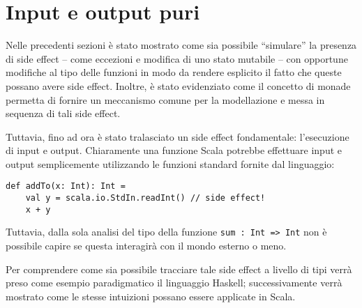 \section{Input e output puri}
\label{section:input-e-output-puri}

Nelle precedenti sezioni è stato mostrato come sia possibile ``simulare'' la presenza di side effect -- come eccezioni e modifica di uno stato mutabile -- con opportune modifiche al tipo delle funzioni in modo da rendere esplicito il fatto che queste possano avere side effect.
Inoltre, è stato evidenziato come il concetto di monade permetta di fornire un meccanismo comune per la modellazione e messa in sequenza di tali side effect.

Tuttavia, fino ad ora è stato tralasciato un side effect fondamentale: l'esecuzione di input e output.
Chiaramente una funzione Scala potrebbe effettuare input e output semplicemente utilizzando le funzioni standard fornite dal linguaggio:
\begin{lstlisting}[language=scala3]
def addTo(x: Int): Int =
	val y = scala.io.StdIn.readInt() // side effect!
	x + y
\end{lstlisting}\label{code:addToScalaImpure}
Tuttavia, dalla sola analisi del tipo della funzione \lstinline{sum : Int => Int} non è possibile capire se questa interagirà con il mondo esterno o meno.

Per comprendere come sia possibile tracciare tale side effect a livello di tipi verrà preso come esempio paradigmatico il linguaggio Haskell; successivamente verrà mostrato come le stesse intuizioni possano essere applicate in Scala.

